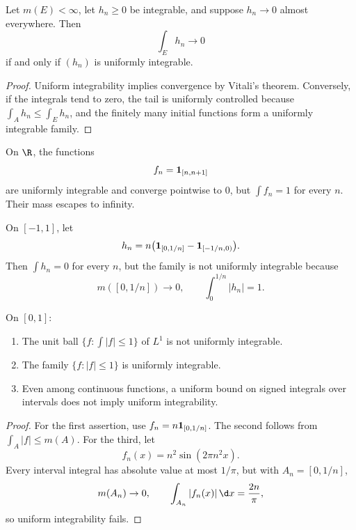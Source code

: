 \begin{cor}
Let $m(E)<\infty$, let $h_n\geq0$ be integrable, and suppose $h_n\to0$ almost everywhere. Then
\[
\int_Eh_n\longrightarrow0
\]
if and only if $(h_n)$ is uniformly integrable.
\end{cor}

\begin{proof}
Uniform integrability implies convergence by Vitali's theorem. Conversely, if the integrals tend to zero, the tail is uniformly controlled because $\int_Ah_n\leq\int_Eh_n$, and the finitely many initial functions form a uniformly integrable family.
\end{proof}

\begin{eg}
On $\R$, the functions
\[
f_n=\mathbf{1}_{[n,n+1]}
\]
are uniformly integrable and converge pointwise to $0$, but $\int f_n=1$ for every $n$. Their mass escapes to infinity.
\end{eg}

\begin{eg}
On $[-1,1]$, let
\[
h_n=n\bigl(\mathbf{1}_{[0,1/n]}-\mathbf{1}_{[-1/n,0)}\bigr).
\]
Then $\int h_n=0$ for every $n$, but the family is not uniformly integrable because
\[
m([0,1/n])\to0,
\qquad
\int_0^{1/n}|h_n|=1.
\]
\end{eg}

\begin{prop}
On $[0,1]$:
\begin{enumerate}
  \item The unit ball $\{f:\int|f|\leq1\}$ of $L^1$ is not uniformly integrable.
  \item The family $\{f:|f|\leq1\}$ is uniformly integrable.
  \item Even among continuous functions, a uniform bound on signed integrals over intervals does not imply uniform integrability.
\end{enumerate}
\end{prop}

\begin{proof}
For the first assertion, use $f_n=n\mathbf{1}_{[0,1/n]}$. The second follows from $\int_A|f|\leq m(A)$. For the third, let
\[
f_n(x)=n^2\sin(2\pi n^2x).
\]
Every interval integral has absolute value at most $1/\pi$, but with $A_n=[0,1/n]$,
\[
m(A_n)\to0,
\qquad
\int_{A_n}|f_n(x)|\,\d x=\frac{2n}{\pi},
\]
so uniform integrability fails.
\end{proof}

